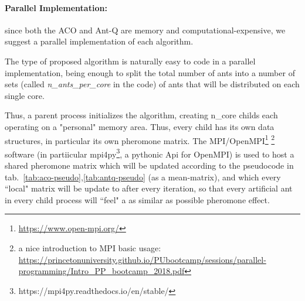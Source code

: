 \documentclass[10pt]{article}
\begin{document}
\paragraph{Parallel Implementation:}\label{par:parall} since both the ACO and Ant-Q are memory and computational-expensive, we suggest a parallel implementation of each algorithm.

The type of proposed algorithm is naturally easy to code in a parallel implementation, being enough to split the total number of ants into a number of sets (called \textit{n\_ants\_per\_core} in the code) of ants that will be distributed on each single core.

Thus, a parent process initializes the algorithm, creating n\_core childs each operating on a "personal" memory area. 
Thus, every child has its own data structures, in particular its own pheromone matrix. 
The MPI/OpenMPI\footnote{\url{https://www.open-mpi.org/}} \footnote{a nice introduction to MPI basic usage: \url{https://princetonuniversity.github.io/PUbootcamp/sessions/parallel-programming/Intro_PP_bootcamp_2018.pdf}} software (in partiicular mpi4py\footnote{https://mpi4py.readthedocs.io/en/stable/}, a pythonic Api for OpenMPI) is used to host a shared pheromone matrix which will be updated according to the pseudocode in tab.~\ref{tab:aco-pseudo},\ref{tab:antq-pseudo} (as a mean-matrix), and which every ``local" matrix will be update to after every iteration, so that every artificial ant in every child process will ``feel" a as similar as possible pheromone effect.
\end{document}
